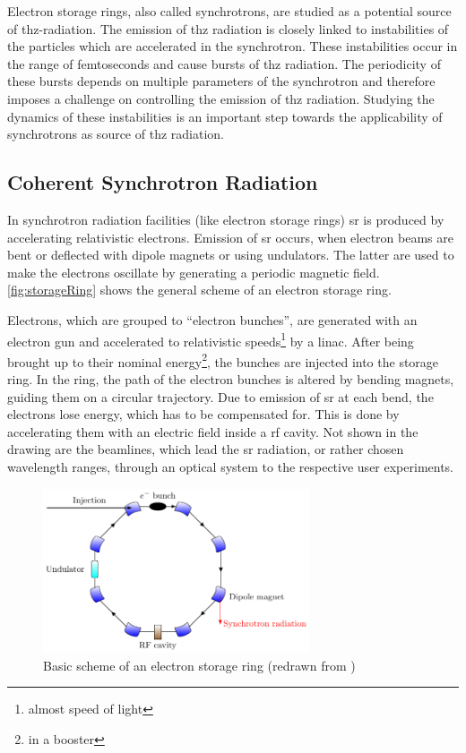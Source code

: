 Electron storage rings, also called synchrotrons, are studied as a potential source of \gls{thz}-radiation. 
The emission of \gls{thz} radiation is closely linked to instabilities of the particles which are accelerated in the synchrotron. 
These instabilities occur in the range of femtoseconds and cause bursts of \gls{thz} radiation.
The periodicity of these bursts depends on multiple parameters of the synchrotron and therefore imposes a challenge on controlling the emission of \gls{thz} radiation.
Studying the dynamics of these instabilities is an important step towards the applicability of synchrotrons as source of \gls{thz} radiation. \cite{rota2018}



\subsection*{Coherent Synchrotron Radiation}
In synchrotron radiation facilities (like electron storage rings) \gls{sr} is produced by accelerating relativistic electrons.
Emission of \gls{sr} occurs, when electron beams are bent or deflected with dipole magnets or using undulators. The latter are used to make the electrons oscillate by generating a periodic magnetic field.  
\autoref{fig:storageRing} shows the general scheme of an electron storage ring.

Electrons, which are grouped to ``electron bunches'', are generated with an electron gun and accelerated to relativistic speeds\footnote{almost speed of light} by a \gls{linac}.
After being brought up to their nominal energy\footnote{in a booster}, the bunches are injected into the storage ring.
In the ring, the path of the electron bunches is altered by bending magnets, guiding them on a circular trajectory.
Due to emission of \gls{sr} at each bend, the electrons lose energy, which has to be compensated for.
This is done by accelerating them with an electric field inside a \gls{rf} cavity.
Not shown in the drawing are the beamlines, which lead the \gls{sr} radiation, or rather chosen wavelength ranges, through an optical system to the respective user experiments. \cite{roussel2014} \cite{rota2018}

\begin{figure}[tbh]
	\centering
	\includegraphics[width=0.7\textwidth]{chap/02-theory/img/synchrotron}
	\caption{Basic scheme of an electron storage ring (redrawn from \cite{roussel2014})}
	\label{fig:storageRing}
\end{figure}


